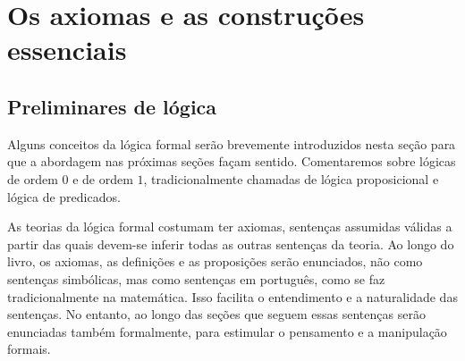 \chapter{Os axiomas e as construções essenciais}

\section{Preliminares de lógica}

Alguns conceitos da lógica formal serão brevemente introduzidos nesta seção para que a abordagem nas próximas seções façam sentido. Comentaremos sobre lógicas de ordem $0$ e de ordem $1$, tradicionalmente chamadas de lógica proposicional e lógica de predicados.

As teorias da lógica formal costumam ter axiomas, sentenças assumidas válidas a partir das quais devem-se inferir todas as outras sentenças da teoria. Ao longo do livro, os axiomas, as definições e as proposições serão enunciados, não como sentenças simbólicas, mas como sentenças em português, como se faz tradicionalmente na matemática. Isso facilita o entendimento e a naturalidade das sentenças. No entanto, ao longo das seções que seguem essas sentenças serão enunciadas também formalmente, para estimular o pensamento e a manipulação formais.

